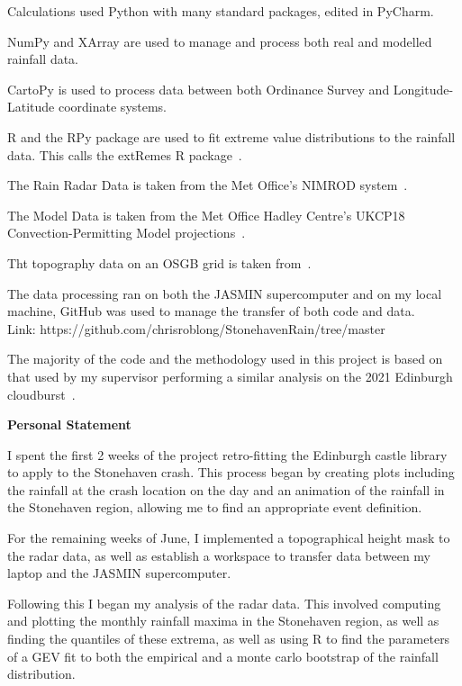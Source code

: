 \documentclass[12pt,a4paper,openany]{report}
\begin{document}
\bigskip

Calculations used Python with many standard packages, edited in PyCharm.

NumPy and XArray are used to manage and process both real and modelled rainfall data.

CartoPy is used to process data between both Ordinance Survey and Longitude-Latitude coordinate systems.

R and the RPy package are used to fit extreme value distributions to the rainfall data.
This calls the extRemes R package~\cite{extremes_R}.

The Rain Radar Data is taken from the Met Office's NIMROD system~\cite{radar_data}.

The Model Data is taken from the Met Office Hadley Centre's UKCP18 Convection-Permitting Model projections~\cite{model_data}.

Tht topography data on an OSGB grid is taken from~\cite{radar_topog}.

The data processing ran on both the JASMIN supercomputer and on my local machine,
GitHub was used to manage the transfer of both code and data. \\
Link: https://github.com/chrisroblong/StonehavenRain/tree/master

The majority of the code and the methodology used in this project is based on that used by my supervisor performing a similar analysis on the 2021 Edinburgh cloudburst~\cite{Tett_Soon}.


\newpage

\begin{center}
\textbf{Personal Statement} %
\end{center}

I spent the first 2 weeks of the project retro-fitting the Edinburgh castle
library to apply to the Stonehaven crash.
This process began by creating plots including the
rainfall at the crash location on the day and an animation of the rainfall
in the Stonehaven region, allowing me to find an appropriate event definition.

For the remaining weeks of June, I implemented a topographical height mask
to the radar data, as well as establish a workspace to transfer data between
my laptop and the JASMIN supercomputer.

Following this I began my analysis of the radar data.
This involved computing and plotting the monthly rainfall maxima in
the Stonehaven region, as well as finding the quantiles of these extrema,
as well as using R to find the parameters of a GEV fit to both the empirical
and a monte carlo bootstrap of the rainfall distribution.
\end{document}

